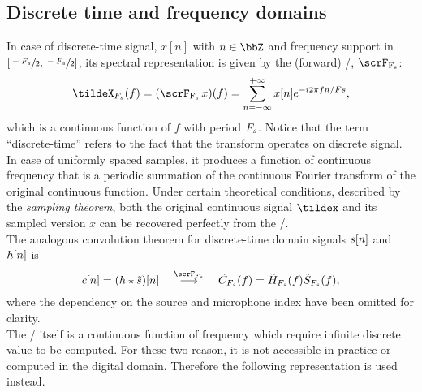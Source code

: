 \subsection{Discrete time and frequency domains}\label{subsec:processing:dtft_dft}
In case of discrete-time signal, $x[n]$ with $n \in \bbZ$ and frequency support in $[\sfrac{-F_s}{2}, \sfrac{-F_s}{2}]$, its spectral representation is given by the (forward) \DTFTdef/, $\dtft$:
\begin{equation}\label{eq:processing:dtft}
    \tildeX_{\Fs}(f) = (\dtft{x})(f) =
    \sum_{n = -\infty}^{+\infty}
    x[ n]
    \cste^{-\csti 2 \pi f n / Fs}
    ,
\end{equation}
which is a continuous function of $f$ with period $F_s$.
Notice that the term ``discrete-time'' refers to the fact that the transform operates on discrete signal.
In case of uniformly spaced samples, it produces a function of continuous frequency that is a periodic summation of the continuous Fourier transform of the original continuous function.
Under certain theoretical conditions, described by the \textit{sampling theorem}, both the original continuous signal $\tildex$ and its sampled version $x$ can be recovered perfectly from the \DTFT/.
\\The analogous convolution theorem for discrete-time domain signals $s[n]$ and $h[n]$ is
\begin{equation}\label{eq:processing:conv_dtft}
    \img[n] = \kparen{\rir \convCont \tilde{\src}} [ n]
    \mathspace\overset{\dtft}{\kto}\mathspace
    \tilde{\IMG}_{\Fs}( f) =  \tilde{\FLT}_{\Fs}( f) \tilde{\SRC}_{\Fs}( f)
    ,
\end{equation}
where the dependency on the source and microphone index have been omitted for clarity.
\\The \DTFT/ itself is a continuous function of frequency which require infinite discrete value to be computed.
For these two reason, it is not accessible in practice or computed in the digital domain.
Therefore the following representation is used instead.

